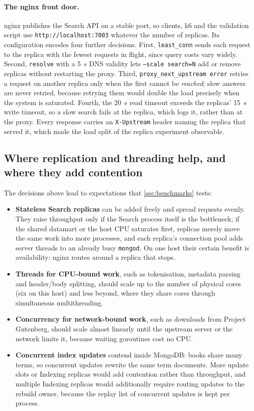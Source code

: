 \documentclass[10pt,a4paper]{article}
\newcommand{\code}[1]{\texttt{#1}}
\begin{document}
\paragraph{The nginx front door.}
nginx publishes the Search API on a stable port, so clients, k6 and the
validation script use \code{http://localhost:7003} whatever the number of
replicas. Its configuration encodes four further decisions. First,
\code{least\_conn} sends each request to the replica with the fewest requests
in flight, since query costs vary widely. Second, \code{resolve} with a 5~s DNS
validity lets \code{--scale search=N} add or remove replicas without
restarting the proxy. Third, \code{proxy\_next\_upstream error} retries a
request on another replica only when the first cannot be \emph{reached}; slow
answers are never retried, because retrying them would double the load
precisely when the system is saturated. Fourth, the 20~s read timeout exceeds
the replicas' 15~s write timeout, so a slow search fails at the replica, which
logs it, rather than at the proxy. Every response carries an
\code{X-Upstream} header naming the replica that served it, which made the load
split of the replica experiment observable.

\subsection{Where replication and threading help, and where they add contention}
\label{sec:decision-scaling}

The decisions above lead to expectations that \cref{sec:benchmarks} tests:

\begin{itemize}
  \item \textbf{Stateless Search replicas} can be added freely and spread
  requests evenly. They raise throughput only if the Search process itself is
  the bottleneck; if the shared datamart or the host CPU saturates first,
  replicas merely move the same work into more processes, and each replica's
  connection pool adds server threads to an already busy \code{mongod}. On one
  host their certain benefit is availability: nginx routes around a replica
  that stops.
  \item \textbf{Threads for CPU-bound work}, such as tokenisation, metadata
  parsing and header/body splitting, should scale up to the number of physical
  cores (six on this host) and less beyond, where they share cores through
  simultaneous multithreading.
  \item \textbf{Concurrency for network-bound work}, such as downloads from
  Project Gutenberg, should scale almost linearly until the upstream server or
  the network limits it, because waiting goroutines cost no CPU.
  \item \textbf{Concurrent index updates} contend inside MongoDB: books share
  many terms, so concurrent updates rewrite the same term documents. More
  update slots or Indexing replicas would add contention rather than
  throughput, and multiple Indexing replicas would additionally require routing
  updates to the rebuild owner, because the replay list of concurrent updates
  is kept per process.
\end{itemize}
\end{document}

